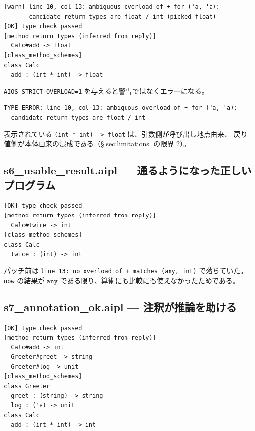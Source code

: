 \documentclass[11pt,a4paper]{ltjsarticle}
\theoremstyle{definition}
\theoremstyle{remark}
\newcommand{\ty}[1]{\ensuremath{\mathtt{#1}}}
\begin{document}
\begin{lstlisting}[language={}]
[warn] line 10, col 13: ambiguous overload of + for ('a, 'a):
       candidate return types are float / int (picked float)
[OK] type check passed
[method return types (inferred from reply)]
  Calc#add -> float
[class_method_schemes]
class Calc
  add : (int * int) -> float
\end{lstlisting}

\texttt{AIOS\_STRICT\_OVERLOAD=1} を与えると警告ではなくエラーになる。

\begin{lstlisting}[language={}]
TYPE_ERROR: line 10, col 13: ambiguous overload of + for ('a, 'a):
  candidate return types are float / int
\end{lstlisting}

表示されている \texttt{(int * int) -> float} は、引数側が呼び出し地点由来、
戻り値側が本体由来の混成である（\S\ref{sec:limitations} の限界 2）。

\subsection{s6\_usable\_result.aipl --- 通るようになった正しいプログラム}



\begin{lstlisting}[language={}]
[OK] type check passed
[method return types (inferred from reply)]
  Calc#twice -> int
[class_method_schemes]
class Calc
  twice : (int) -> int
\end{lstlisting}

パッチ前は \texttt{line 13: no overload of + matches (any, int)} で落ちていた。
\texttt{now} の結果が \ty{any} である限り、算術にも比較にも使えなかったためである。

\subsection{s7\_annotation\_ok.aipl --- 注釈が推論を助ける}



\begin{lstlisting}[language={}]
[OK] type check passed
[method return types (inferred from reply)]
  Calc#add -> int
  Greeter#greet -> string
  Greeter#log -> unit
[class_method_schemes]
class Greeter
  greet : (string) -> string
  log : ('a) -> unit
class Calc
  add : (int * int) -> int
\end{lstlisting}
\end{document}
